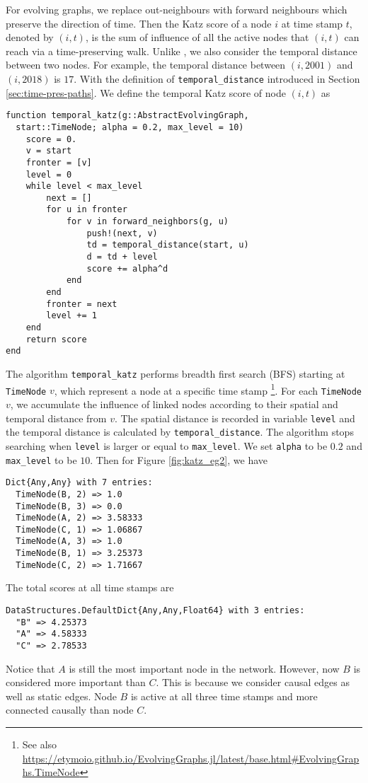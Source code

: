 \documentclass[12pt]{article}
\theoremstyle{definition}
\begin{document}
For evolving graphs, we replace out-neighbours with forward neighbours which preserve the direction of time.
Then the Katz score of a node $i$ at time stamp $t$, denoted by $(i,t)$, is the sum of influence of all the active nodes that $(i,t)$ can reach via a time-preserving walk.
Unlike \cite{grindrod11}, we also consider the temporal distance between two nodes. For example, the temporal distance between $(i, 2001)$ and $(i, 2018)$ is $17$.
With the definition of \texttt{temporal\_distance} introduced in Section \ref{sec:time-pres-paths}.
We define the temporal Katz score of node $(i, t)$ as

\begin{lstlisting}[caption={Temporal Katz Centrality of Single Node},label={lst:katz}]
function temporal_katz(g::AbstractEvolvingGraph,
  start::TimeNode; alpha = 0.2, max_level = 10)
    score = 0.
    v = start
    fronter = [v]
    level = 0
    while level < max_level
        next = []
        for u in fronter
            for v in forward_neighbors(g, u)
                push!(next, v)
                td = temporal_distance(start, u)
                d = td + level
                score += alpha^d
            end
        end
        fronter = next
        level += 1
    end
    return score
end
\end{lstlisting}

The algorithm \texttt{temporal\_katz} performs breadth first search (BFS) starting at \texttt{TimeNode} $v$, which represent a node at a specific time stamp \footnote{See also \url{https://etymoio.github.io/EvolvingGraphs.jl/latest/base.html#EvolvingGraphs.TimeNode}}.
For each \texttt{TimeNode} $v$, we accumulate the influence of linked nodes according to their spatial and temporal
distance from $v$. The spatial distance is recorded in variable \texttt{level} and the temporal distance is calculated by
\texttt{temporal\_distance}. The algorithm stops searching when \texttt{level} is larger or equal to \texttt{max\_level}.
We set \texttt{alpha} to be $0.2$ and \texttt{max\_level} to be $10$. Then
for Figure \ref{fig:katz_eg2}, we have
\begin{lstlisting}
Dict{Any,Any} with 7 entries:
  TimeNode(B, 2) => 1.0
  TimeNode(B, 3) => 0.0
  TimeNode(A, 2) => 3.58333
  TimeNode(C, 1) => 1.06867
  TimeNode(A, 3) => 1.0
  TimeNode(B, 1) => 3.25373
  TimeNode(C, 2) => 1.71667
\end{lstlisting}
The total scores at all time stamps are
\begin{lstlisting}
DataStructures.DefaultDict{Any,Any,Float64} with 3 entries:
  "B" => 4.25373
  "A" => 4.58333
  "C" => 2.78533
\end{lstlisting}
Notice that $A$ is still the most important node in the network. However, now $B$ is considered more important
than $C$. This is because we consider causal edges as well as static edges. Node $B$ is active at all three time stamps
and more connected causally than node $C$.
\end{document}

